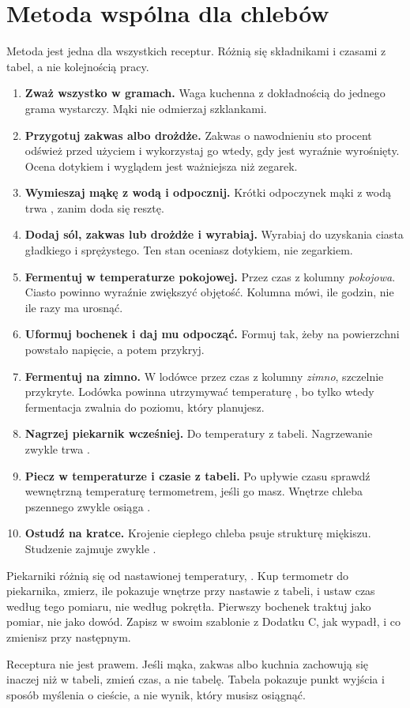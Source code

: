 \section*{Metoda wspólna dla chlebów}

Metoda jest jedna dla wszystkich receptur. Różnią się składnikami i czasami z tabel, a nie kolejnością pracy.

\begin{enumerate}
\item \textbf{Zważ wszystko w gramach.} Waga kuchenna z dokładnością do jednego grama wystarczy. Mąki nie odmierzaj szklankami.
\item \textbf{Przygotuj zakwas albo drożdże.} Zakwas o nawodnieniu sto procent odśwież przed użyciem i wykorzystaj go wtedy, gdy jest wyraźnie wyrośnięty. Ocena dotykiem i wyglądem jest ważniejsza niż zegarek.
\item \textbf{Wymieszaj mąkę z wodą i odpocznij.} Krótki odpoczynek mąki z wodą trwa , zanim doda się resztę.
\item \textbf{Dodaj sól, zakwas lub drożdże i wyrabiaj.} Wyrabiaj do uzyskania ciasta gładkiego i sprężystego. Ten stan oceniasz dotykiem, nie zegarkiem.
\item \textbf{Fermentuj w temperaturze pokojowej.} Przez czas z kolumny \emph{pokojowa}. Ciasto powinno wyraźnie zwiększyć objętość. Kolumna mówi, ile godzin, nie ile razy ma urosnąć.
\item \textbf{Uformuj bochenek i daj mu odpocząć.} Formuj tak, żeby na powierzchni powstało napięcie, a potem przykryj.
\item \textbf{Fermentuj na zimno.} W lodówce przez czas z kolumny \emph{zimno}, szczelnie przykryte. Lodówka powinna utrzymywać temperaturę , bo tylko wtedy fermentacja zwalnia do poziomu, który planujesz.
\item \textbf{Nagrzej piekarnik wcześniej.} Do temperatury z tabeli. Nagrzewanie zwykle trwa .
\item \textbf{Piecz w temperaturze i czasie z tabeli.} Po upływie czasu sprawdź wewnętrzną temperaturę termometrem, jeśli go masz. Wnętrze chleba pszennego zwykle osiąga .
\item \textbf{Ostudź na kratce.} Krojenie ciepłego chleba psuje strukturę miękiszu. Studzenie zajmuje zwykle .
\end{enumerate}

\begin{piekarnik}
Piekarniki różnią się od nastawionej temperatury, . Kup termometr do piekarnika, zmierz, ile pokazuje wnętrze przy nastawie z tabeli, i ustaw czas według tego pomiaru, nie według pokrętła. Pierwszy bochenek traktuj jako pomiar, nie jako dowód. Zapisz w swoim szablonie z Dodatku C, jak wypadł, i co zmienisz przy następnym.
\end{piekarnik}

Receptura nie jest prawem. Jeśli mąka, zakwas albo kuchnia zachowują się inaczej niż w tabeli, zmień czas, a nie tabelę. Tabela pokazuje punkt wyjścia i sposób myślenia o cieście, a nie wynik, który musisz osiągnąć.
